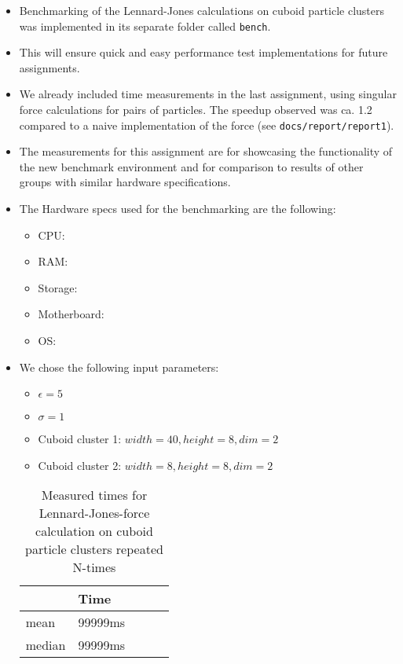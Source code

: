 \documentclass{article}
\begin{document}
\begin{itemize}
    \item Benchmarking of the Lennard-Jones calculations on cuboid particle clusters was implemented in its separate folder called \texttt{bench}.
    \item This will ensure quick and easy performance test implementations for future assignments.
    \item We already included time measurements in the last assignment, using singular force calculations for pairs of particles. The speedup observed was ca. 1.2 compared to a naive implementation of the force (see \texttt{docs/report/report1}).
    \item The measurements for this assignment are for showcasing the functionality of the new benchmark environment and for comparison to results of other groups with similar hardware specifications.
    \item The Hardware specs used for the benchmarking are the following:
    \begin{itemize}
        \item CPU:
        \item RAM:
        \item Storage:
        \item Motherboard:
        \item OS:
    \end{itemize}
    \item We chose the following input parameters:
    \begin{itemize}
        \item $\epsilon = 5$
        \item $\sigma = 1$
        \item Cuboid cluster 1: $width = 40, height = 8, dim = 2$
        \item Cuboid cluster 2: $width = 8, height = 8, dim = 2$
    \end{itemize}
    \begin{table}[H]
        \centering
        \begin{tabular}{|l|l|l|l|l|}
            \hline
            & Time \\ \hline
            mean & 99999ms                  \\ \hline
            median & 99999ms                  \\ \hline
        \end{tabular}
        \caption{Measured times for Lennard-Jones-force calculation on cuboid particle clusters repeated N-times}
        \label{tab:benchmark}
    \end{table}
\end{itemize}
\end{document}
